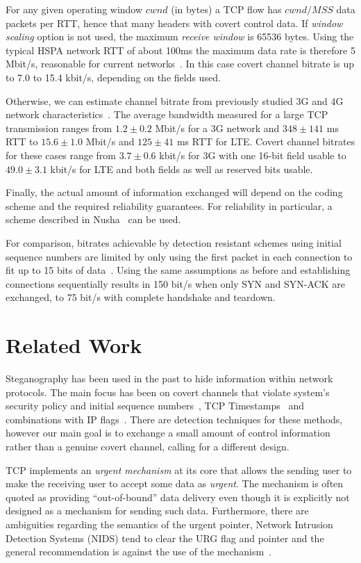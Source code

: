 \documentclass{sig-alternate-10pt}
\begin{document}
For any given operating window $cwnd$ (in bytes) a TCP flow has $cwnd/MSS$ data packets per RTT, hence that many headers with covert control data. If \emph{window scaling} option is not used, the maximum \emph{receive window} is 65536 bytes. Using the typical HSPA network RTT of about 100ms the maximum data rate is therefore 5 Mbit/s, reasonable for current networks~\cite{Chen:2012vj}. In this case covert channel bitrate is up to 7.0 to 15.4 kbit/s, depending on the fields used.

Otherwise, we can estimate channel bitrate from previously studied 3G and 4G network characteristics~\cite{Chen:2012vj}. The average bandwidth measured for a large TCP transmission ranges from $1.2\pm 0.2$ Mbit/s for a 3G network and $348\pm 141$ ms RTT to $15.6\pm 1.0$ Mbit/s and $125\pm 41$ ms RTT for LTE. Covert channel bitrates for these cases range from $3.7 \pm 0.6$ kbit/s for 3G with one 16-bit field usable to $49.0 \pm 3.1$ kbit/s for LTE and both fields as well as reserved bits usable.

Finally, the actual amount of information exchanged will depend on the coding scheme and the required reliability guarantees. For reliability in particular, a scheme described in Nusha~\cite{Rutkowska:2004ul} can be used.

For comparison, bitrates achievable by detection resistant schemes using initial sequence numbers are limited by only using the first packet in each connection to fit up to 15 bits of data~\cite{Murdoch:2005fz}. Using the same assumptions as before and establishing connections sequentially results in 150 bit/s when only SYN and SYN-ACK are exchanged, to 75 bit/s with complete handshake and teardown.

\section{Related Work}
\label{sec:related}

Steganography has been used in the past to hide information within network protocols. The main focus has been on covert channels that violate system's security policy and initial sequence numbers~\cite{Rowland:1997vq}, TCP Timestamps~\cite{Giffin:2002wh} and combinations with IP flags~\cite{Murdoch:2005fz}. There are detection techniques for these methods, however our main goal is to exchange a small amount of control information rather than a genuine covert channel, calling for a different design.

TCP implements an \emph{urgent mechanism} at its core that allows the sending user to make the receiving user to accept some data as \emph{urgent}. The mechanism is often quoted as providing ``out-of-bound'' data delivery even though it is explicitly not designed as a mechanism for sending such data. Furthermore, there are ambiguities regarding the semantics of the urgent pointer, Network Intrusion Detection Systems (NIDS) tend to clear the URG flag and pointer and the general recommendation is against the use of the mechanism~\cite{Gont:2011vi}.
\end{document}
